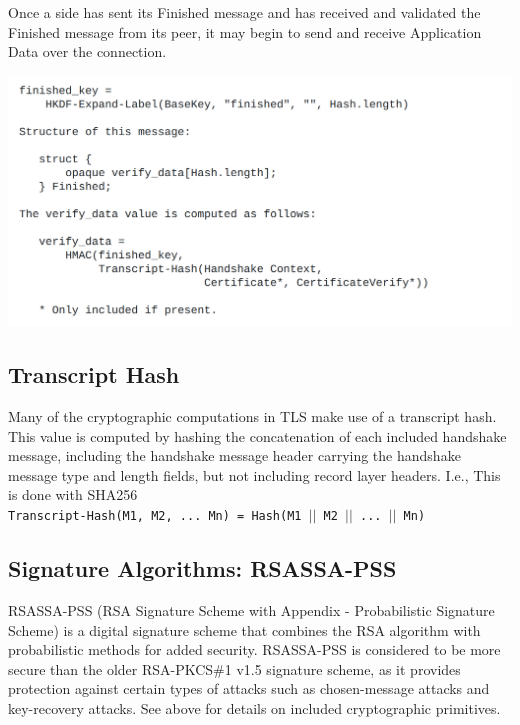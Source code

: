 \documentclass{article}
\begin{document}
Once a side has sent its Finished message and has received and
validated the Finished message from its peer, it may begin to send
and receive Application Data over the connection.

\begin{center}
    \includegraphics[width=1.1\columnwidth]{media/Finshed.png}
\end{center}

\subsection{Transcript Hash}
Many of the cryptographic computations in TLS make use of a
transcript hash.  This value is computed by hashing the concatenation
of each included handshake message, including the handshake message
header carrying the handshake message type and length fields, but not
including record layer headers.  I.e., This is done with SHA256\\

\texttt{Transcript-Hash(M1, M2, ... Mn) = Hash(M1 $||$ M2 $||$ ... $||$ Mn)}

\subsection{Signature Algorithms: RSASSA-PSS}
RSASSA-PSS (RSA Signature Scheme with Appendix - Probabilistic Signature Scheme) is a digital signature scheme that combines the RSA algorithm with probabilistic methods for added security.
RSASSA-PSS is considered to be more secure than the older RSA-PKCS\#1 v1.5 signature scheme,
as it provides protection against certain types of attacks such as chosen-message attacks and key-recovery attacks.
See above for details on included cryptographic primitives.
\end{document}
